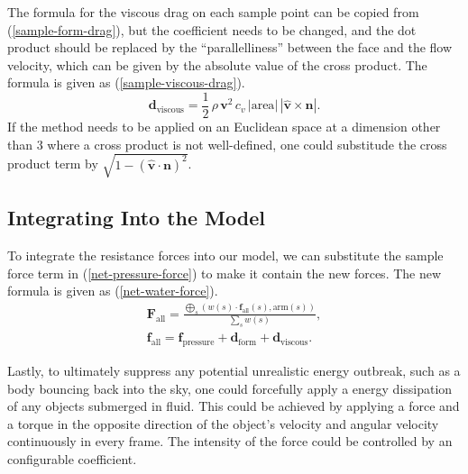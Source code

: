 The formula for the viscous drag on each sample point can be copied from (\ref{sample-form-drag}), but the coefficient needs to be changed, and the dot product should be replaced by the ``parallelliness'' between the face and the flow velocity, which can be given by the absolute value of the cross product.
The formula is given as (\ref{sample-viscous-drag}).
\begin{equation}
	\mathbf{d}_{\text{viscous}}=\frac{1}{2}\,\rho\,\mathbf{v}^2\,c_v\,|\text{area}|\,|\hat{\mathbf{v}}\times\mathbf{n}|.
	\label{sample-viscous-drag}
\end{equation}
If the method needs to be applied on an Euclidean space at a dimension other than 3 where a cross product is not well-defined, one could substitude the cross product term by $\sqrt{1-(\hat{\mathbf{v}}\cdot\mathbf{n})^2}$.

\subsection{Integrating Into the Model}

To integrate the resistance forces into our model, we can substitute the sample force term in (\ref{net-pressure-force}) to make it contain the new forces.
The new formula is given as (\ref{net-water-force}).
\begin{equation}\begin{split}
	\mathbf{F}_{\text{all}}=\frac
		{
			\bigoplus_{s}
			\left(
				w(s)\cdot\mathbf{f}_{\text{all}}(s)
				,
				\text{arm}(s)
			\right)
		}
		{\sum_{s}w(s)},
	\\
	\mathbf{f}_{\text{all}}=\mathbf{f}_{\text{pressure}}+\mathbf{d}_{\text{form}}+\mathbf{d}_{\text{viscous}}.
	\label{net-water-force}
\end{split}\end{equation}

Lastly, to ultimately suppress any potential unrealistic energy outbreak, such as a body bouncing back into the sky, one could forcefully apply a energy dissipation of any objects submerged in fluid.
This could be achieved by applying a force and a torque in the opposite direction of the object's velocity and angular velocity continuously in every frame.
The intensity of the force could be controlled by an configurable coefficient.